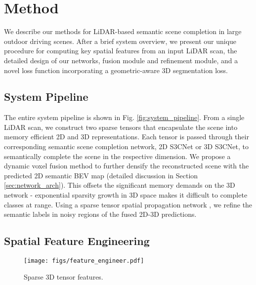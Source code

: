 \documentclass{article}
\begin{document}
\section{Method}
\label{sec:method}

We describe our methods for LiDAR-based semantic scene completion in large outdoor driving scenes. After a brief system overview, we present our unique procedure for computing key spatial features from an input LiDAR scan, the detailed design of our networks, fusion module and refinement module, and a novel loss function incorporating a geometric-aware 3D segmentation loss.

\subsection{System Pipeline}





The entire system pipeline is shown in Fig. \ref{fig:system_pipeline}. From a single LiDAR scan, we construct two sparse tensors that encapsulate the scene into memory efficient 2D and 3D representations. Each tensor is passed through their corresponding semantic scene completion network, 2D S3CNet or 3D S3CNet, to semantically complete the scene in the respective dimension. We propose a dynamic voxel fusion method to further densify the reconstructed scene with the predicted 2D semantic BEV map (detailed discussion in Section \ref{sec:network_arch}). This offsets the significant memory demands on the 3D network - exponential sparsity growth in 3D space makes it difficult to complete classes at range. Using a sparse tensor spatial propagation network \cite{liu2017learning}, we refine the semantic labels in noisy regions of the fused 2D-3D predictions.









\subsection{Spatial Feature Engineering}
\label{sec:feature_engineering}


\setlength{\columnsep}{1pt}\begin{wrapfigure}{r}{7cm}
  \centering
  \texttt{[image: figs/feature\_engineer.pdf]}
  \captionsetup{font=scriptsize,labelfont=scriptsize}
  \caption{Sparse 3D tensor features.}
  \label{fig:sparse_tensor_features}
  \vspace{-10px}
\end{wrapfigure}
\end{document}
